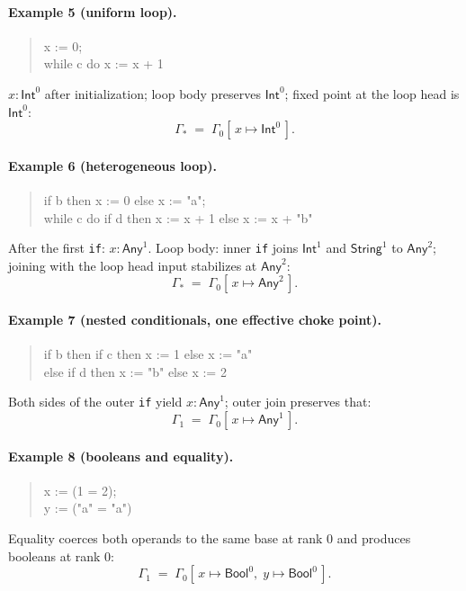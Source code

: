 \paragraph{Example 5 (uniform loop).}
\begin{quote}\ttfamily
x := 0;\\
while c do x := x + 1
\end{quote}
$x:\textsf{Int}^{0}$ after initialization; loop body preserves $\textsf{Int}^{0}$;
fixed point at the loop head is $\textsf{Int}^{0}$:
\[
\Gamma_{\!*} \;=\; \Gamma_0[\,x \mapsto \textsf{Int}^{0}\,].
\]

\paragraph{Example 6 (heterogeneous loop).}
\begin{quote}\ttfamily
if b then x := 0 else x := "a";\\
while c do if d then x := x + 1 else x := x + "b"
\end{quote}
After the first \texttt{if}: $x:\textsf{Any}^{1}$.  
Loop body: inner \texttt{if} joins $\textsf{Int}^{1}$ and $\textsf{String}^{1}$ to $\textsf{Any}^{2}$;
joining with the loop head input stabilizes at $\textsf{Any}^{2}$:
\[
\Gamma_{\!*} \;=\; \Gamma_0[\,x \mapsto \textsf{Any}^{2}\,].
\]

\paragraph{Example 7 (nested conditionals, one effective choke point).}
\begin{quote}\ttfamily
if b then if c then x := 1 else x := "a"\\
\phantom{if b\ } else if d then x := "b" else x := 2
\end{quote}
Both sides of the outer \texttt{if} yield $x:\textsf{Any}^{1}$; outer join preserves that:
\[
\Gamma_1 \;=\; \Gamma_0[\,x \mapsto \textsf{Any}^{1}\,].
\]

\paragraph{Example 8 (booleans and equality).}
\begin{quote}\ttfamily
x := (1 = 2);\\
y := ("a" = "a")
\end{quote}
Equality coerces both operands to the same base at rank $0$ and produces booleans at rank $0$:
\[
\Gamma_1 \;=\; \Gamma_0[\,x \mapsto \textsf{Bool}^{0},\; y \mapsto \textsf{Bool}^{0}\,].
\]

